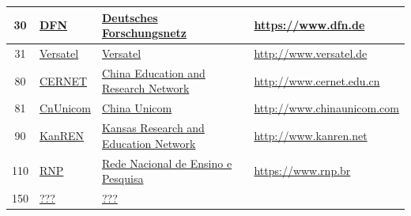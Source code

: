 \begin{small}
\begin{center}
\begin{longtable}{|c|c|c|c|}
 30 & \multicolumn{1}{|l|}{\index{DFN|see{Deutsches Forschungsnetz}}\index{Provider!Deutsches Forschungsnetz}\href{https://www.dfn.de}{DFN}} & \multicolumn{1}{|l|}{\index{Deutsches Forschungsnetz}\href{https://www.dfn.de}{Deutsches Forschungsnetz}} & \multicolumn{1}{|l|}{\tiny{\url{https://www.dfn.de}}} \\ \hline
 31 & \multicolumn{1}{|l|}{\index{Versatel}\index{Provider!Versatel}\href{http://www.versatel.de}{Versatel}} & \multicolumn{1}{|l|}{\index{Versatel}\href{http://www.versatel.de}{Versatel}} & \multicolumn{1}{|l|}{\tiny{\url{http://www.versatel.de}}} \\ \hline
 80 & \multicolumn{1}{|l|}{\index{CERNET|see{China Education and Research Network}}\index{Provider!China Education and Research Network}\href{http://www.cernet.edu.cn}{CERNET}} & \multicolumn{1}{|l|}{\index{China Education and Research Network}\href{http://www.cernet.edu.cn}{China Education and Research Network}} & \multicolumn{1}{|l|}{\tiny{\url{http://www.cernet.edu.cn}}} \\ \hline
 81 & \multicolumn{1}{|l|}{\index{CnUnicom|see{China Unicom}}\index{Provider!China Unicom}\href{http://www.chinaunicom.com}{CnUnicom}} & \multicolumn{1}{|l|}{\index{China Unicom}\href{http://www.chinaunicom.com}{China Unicom}} & \multicolumn{1}{|l|}{\tiny{\url{http://www.chinaunicom.com}}} \\ \hline
 90 & \multicolumn{1}{|l|}{\index{KanREN|see{Kansas Research and Education Network}}\index{Provider!Kansas Research and Education Network}\href{http://www.kanren.net}{KanREN}} & \multicolumn{1}{|l|}{\index{Kansas Research and Education Network}\href{http://www.kanren.net}{Kansas Research and Education Network}} & \multicolumn{1}{|l|}{\tiny{\url{http://www.kanren.net}}} \\ \hline
 110 & \multicolumn{1}{|l|}{\index{RNP|see{Rede Nacional de Ensino e Pesquisa}}\index{Provider!Rede Nacional de Ensino e Pesquisa}\href{https://www.rnp.br}{RNP}} & \multicolumn{1}{|l|}{\index{Rede Nacional de Ensino e Pesquisa}\href{https://www.rnp.br}{Rede Nacional de Ensino e Pesquisa}} & \multicolumn{1}{|l|}{\tiny{\url{https://www.rnp.br}}} \\ \hline
 150 & \multicolumn{1}{|l|}{\index{???}\index{Provider!???}\href{}{???}} & \multicolumn{1}{|l|}{\index{???}\href{}{???}} & \multicolumn{1}{|l|}{\tiny{\url{}}} \\ \hline
\end{longtable}
\end{center}
\end{small}




